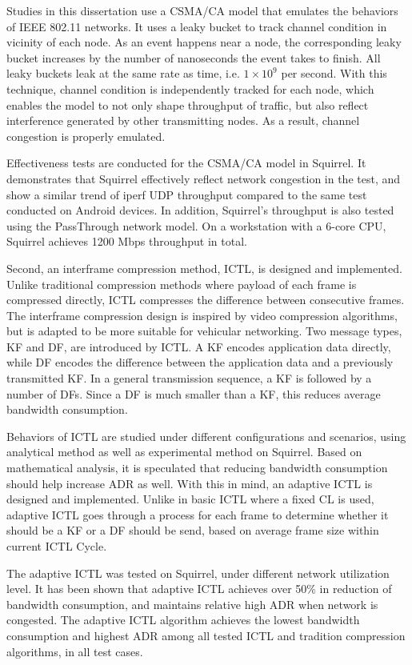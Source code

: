 \documentclass[12pt]{report}
\begin{document}
Studies in this dissertation use a CSMA/CA model that emulates the behaviors of IEEE 802.11 networks. It uses a leaky bucket to track channel condition in vicinity of each node. As an event happens near a node, the corresponding leaky bucket increases by the number of nanoseconds the event takes to finish. All leaky buckets leak at the same rate as time, i.e. $1\times 10^9$ per second. With this technique, channel condition is independently tracked for each node, which enables the model to not only shape throughput of traffic, but also reflect interference generated by other transmitting nodes. As a result, channel congestion is properly emulated.

Effectiveness tests are conducted for the CSMA/CA model in Squirrel. It demonstrates that Squirrel effectively reflect network congestion in the test, and show a similar trend of iperf UDP throughput compared to the same test conducted on Android devices. In addition, Squirrel's throughput is also tested using the PassThrough network model. On a workstation with a 6-core CPU, Squirrel achieves 1200 Mbps throughput in total.

Second, an interframe compression method, ICTL, is designed and implemented. Unlike traditional compression methods where payload of each frame is compressed directly, ICTL compresses the difference between consecutive frames. The interframe compression design is inspired by video compression algorithms, but is adapted to be more suitable for vehicular networking. Two message types, KF and DF, are introduced by ICTL. A KF encodes application data directly, while DF encodes the difference between the application data and a previously transmitted KF. In a general transmission sequence, a KF is followed by a number of DFs. Since a DF is much smaller than a KF, this reduces average bandwidth consumption.

Behaviors of ICTL are studied under different configurations and scenarios, using analytical method as well as experimental method on Squirrel. Based on mathematical analysis, it is speculated that reducing bandwidth consumption should help increase ADR as well. With this in mind, an adaptive ICTL is designed and implemented. Unlike in basic ICTL where a fixed CL is used, adaptive ICTL goes through a process for each frame to determine whether it should be a KF or a DF should be send, based on average frame size within current ICTL Cycle.

The adaptive ICTL was tested on Squirrel, under different network utilization level. It has been shown that adaptive ICTL achieves over 50\% in reduction of bandwidth consumption, and maintains relative high ADR when network is congested. The adaptive ICTL algorithm achieves the lowest bandwidth consumption and highest ADR among all tested ICTL and tradition compression algorithms, in all test cases.
\end{document}
